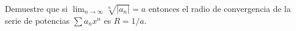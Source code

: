 \item Demuestre que si $\displaystyle\lim_{n \to \infty} \sqrt[n]{|a_n|} = a$ entonces el radio de convergencia de la serie de potencias $\sum a_n x^n$ es $R = 1/a$.
